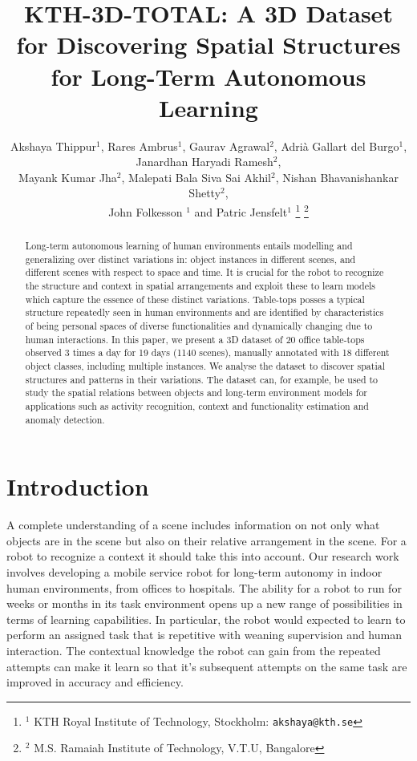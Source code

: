 \documentclass[letterpaper, 10 pt, conference]{ieeeconf}  %
\title{\LARGE \bf
KTH-3D-TOTAL: A 3D Dataset for Discovering Spatial Structures for Long-Term Autonomous
 Learning
}
\author{Akshaya Thippur$^{1}$, Rares Ambrus$^{1}$, Gaurav Agrawal$^{2}$, Adri\`a Gallart del Burgo$^{1}$, Janardhan Haryadi Ramesh$^{2}$, \\Mayank Kumar Jha$^{2}$, Malepati Bala Siva Sai Akhil$^{2}$,  Nishan Bhavanishankar Shetty$^{2}$, \\John Folkesson $^{1}$ and Patric Jensfelt$^{1}$%
\thanks{$^{1}$ KTH Royal Institute of Technology, Stockholm:
        {\tt\small akshaya@kth.se}}%
\thanks{$^{2}$ M.S. Ramaiah Institute of Technology, V.T.U, Bangalore}%
}
\begin{document}
\maketitle
\thispagestyle{empty}
\pagestyle{empty}

\begin{abstract}

Long-term autonomous learning of human environments entails modelling 
and generalizing over distinct variations in: object instances in different scenes, 
and different scenes with respect to space and time. It is crucial for the 
robot to recognize the structure and context in spatial arrangements and 
exploit these to learn models which capture the essence of these distinct variations.
Table-tops posses a typical structure repeatedly seen in human environments
and are identified by characteristics of being personal spaces of diverse
functionalities and dynamically changing due to human interactions. In this
paper, we present a 3D dataset of 20 office table-tops observed 3 times a 
day for 19 days (1140 scenes), manually annotated with 18 different object 
classes, including multiple instances. We analyse the dataset to discover 
spatial structures and patterns in their variations. The dataset can, for example, be used 
to study the spatial relations between objects and long-term environment models 
for applications such as activity recognition, context and functionality estimation and anomaly detection.

\end{abstract}


\section{Introduction}
\label{sec:Introduction}

A complete understanding of a scene includes information on not only 
what objects are in the scene but also on their relative arrangement in
the scene. For a robot to recognize a context it should take this into
account.  Our research work involves developing
a mobile service robot for long-term autonomy in indoor human
environments, from offices to hospitals.  The ability for a robot to
run for weeks or months in its task environment opens up a new range
of possibilities in terms of learning capabilities. In particular, the
robot would expected to learn to perform an assigned task that is
repetitive with weaning supervision and human interaction. The
contextual knowledge the robot can gain from the repeated attempts can
make it learn so that it's subsequent attempts on the same task are
improved in accuracy and efficiency.
\end{document}
